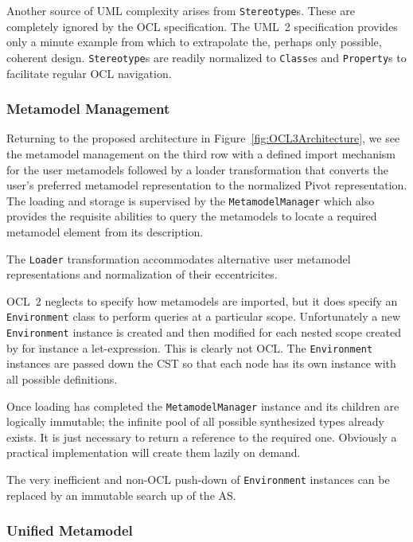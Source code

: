 \documentclass{jot}
\begin{document}
Another source of UML complexity arises from \verb$Stereotype$s. These are completely ignored by the OCL specification. The UML~2 specification provides only a minute example from which to extrapolate the, perhaps only possible, coherent design. \verb$Stereotype$s are readily normalized to \verb$Class$es and \verb$Property$s to facilitate regular OCL navigation.


\subsubsection{Metamodel Management}

Returning to the proposed architecture in Figure~\ref{fig:OCL3Architecture}, we see the metamodel management on the third row with a defined import mechanism for the user metamodels followed by a loader transformation that converts the user's preferred metamodel representation to the normalized Pivot representation. The loading and storage is supervised by the \verb$MetamodelManager$ which also provides the requisite abilities to query the metamodels to locate a required metamodel element from its description.

The \verb$Loader$ transformation accommodates alternative user metamodel representations and normalization of their eccentricites.

OCL~2 neglects to specify how metamodels are imported, but it does specify an \verb$Environment$ class to perform queries at a particular scope. Unfortunately a new \verb$Environment$ instance is created and then modified for each nested scope created by for instance a let-expression. This is clearly not OCL. The \verb$Environment$ instances are passed down the CST so that each node has its own instance with all possible definitions.

Once loading has completed the \verb$MetamodelManager$ instance and its children are logically immutable; the infinite pool of all possible synthesized types already exists. It is just necessary to return a reference to the required one. Obviously a practical implementation will create them lazily on demand.

The very inefficient and non-OCL push-down of \verb$Environment$ instances can be replaced by an immutable search up of the AS.

\subsubsection{Unified Metamodel}
\end{document}
